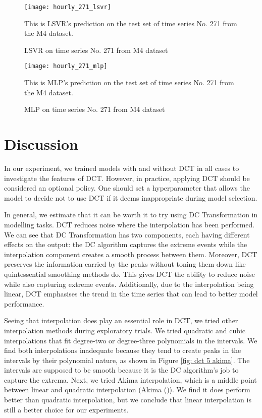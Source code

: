 \begin{figure}[H]
    \centering
    \texttt{[image: hourly\_271\_lsvr]}
    \caption{LSVR on time series No. 271 from M4 dataset}
    {\raggedright \footnotesize This is LSVR's prediction on the test set of time series No. 271 from the M4 dataset.  \par}
    \label{fig: hourly 271 lsvr}
\end{figure}
\begin{figure}[H]
    \centering
    \texttt{[image: hourly\_271\_mlp]}
    \caption{MLP on time series No. 271 from M4 dataset}
    {\raggedright \footnotesize This is MLP's prediction on the test set of time series No. 271 from the M4 dataset.  \par}
    \label{fig: hourly 271 mlp}
\end{figure}

\section{Discussion}
In our experiment, we trained models with and without DCT in all cases to investigate the features of DCT. However, in practice, applying DCT should be considered an optional policy. One should set a hyperparameter that allows the model to decide not to use DCT if it deems inappropriate during model selection.

In general, we estimate that it can be worth it to try using DC Transformation in modelling tasks. DCT reduces noise where the interpolation has been performed. We can see that DC Transformation has two components, each having different effects on the output: the DC algorithm captures the extreme events while the interpolation component creates a smooth process between them. Moreover, DCT preserves the information carried by the peaks without toning them down like quintessential smoothing methods do. This gives DCT the ability to reduce noise while also capturing extreme events. Additionally, due to the interpolation being linear, DCT emphasises the trend in the time series that can lead to better model performance.

Seeing that interpolation does play an essential role in DCT, we tried other interpolation methods during exploratory trials. We tried quadratic and cubic interpolations that fit degree-two or degree-three polynomials in the intervals. We find both interpolations inadequate because they tend to create peaks in the intervals by their polynomial nature, as shown in Figure \ref{fig: dct 5 akima}. The intervals are supposed to be smooth because it is the DC algorithm's job to capture the extrema. Next, we tried Akima interpolation, which is a middle point between linear and quadratic interpolation (Akima (\citeyear{akima1970new})). We find it does perform better than quadratic interpolation, but we conclude that linear interpolation is still a better choice for our experiments.
